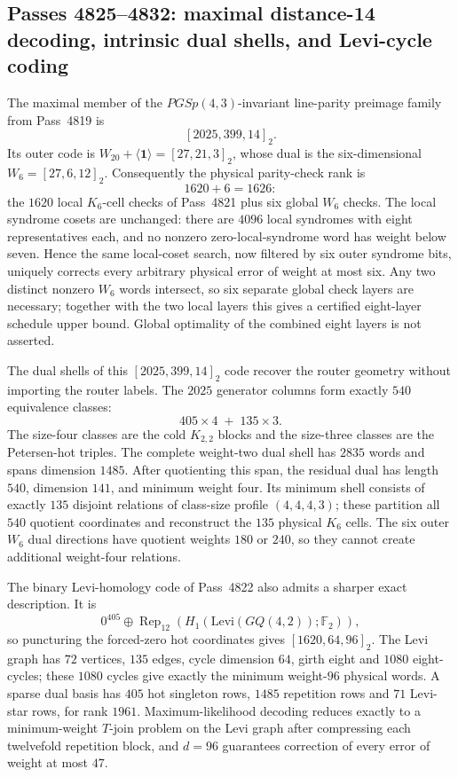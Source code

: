 \subsection{Passes 4825--4832: maximal distance-14 decoding, intrinsic dual shells, and Levi-cycle coding}
\label{subsec:pass4825-4832}

The maximal member of the $PGSp(4,3)$-invariant line-parity preimage family from Pass~4819 is
\[
[2025,399,14]_2.
\]
Its outer code is $W_{20}+\langle\mathbf1\rangle=[27,21,3]_2$, whose dual is the six-dimensional $W_6=[27,6,12]_2$.  Consequently the physical parity-check rank is
\[
1620+6=1626:
\]
the $1620$ local $K_6$-cell checks of Pass~4821 plus six global $W_6$ checks.  The local syndrome cosets are unchanged: there are $4096$ local syndromes with eight representatives each, and no nonzero zero-local-syndrome word has weight below seven.  Hence the same local-coset search, now filtered by six outer syndrome bits, uniquely corrects every arbitrary physical error of weight at most six.  Any two distinct nonzero $W_6$ words intersect, so six separate global check layers are necessary; together with the two local layers this gives a certified eight-layer schedule upper bound.  Global optimality of the combined eight layers is not asserted.

The dual shells of this $[2025,399,14]_2$ code recover the router geometry without importing the router labels.  The $2025$ generator columns form exactly $540$ equivalence classes:
\[
405\times4\; +\;135\times3.
\]
The size-four classes are the cold $K_{2,2}$ blocks and the size-three classes are the Petersen-hot triples.  The complete weight-two dual shell has $2835$ words and spans dimension $1485$.  After quotienting this span, the residual dual has length $540$, dimension $141$, and minimum weight four.  Its minimum shell consists of exactly $135$ disjoint relations of class-size profile $(4,4,4,3)$; these partition all $540$ quotient coordinates and reconstruct the $135$ physical $K_6$ cells.  The six outer $W_6$ dual directions have quotient weights $180$ or $240$, so they cannot create additional weight-four relations.

The binary Levi-homology code of Pass~4822 also admits a sharper exact description.  It is
\[
0^{405}\oplus \operatorname{Rep}_{12}\!\left(H_1(\mathrm{Levi}(GQ(4,2));\mathbb F_2)\right),
\]
so puncturing the forced-zero hot coordinates gives $[1620,64,96]_2$.  The Levi graph has $72$ vertices, $135$ edges, cycle dimension $64$, girth eight and $1080$ eight-cycles; these $1080$ cycles give exactly the minimum weight-$96$ physical words.  A sparse dual basis has $405$ hot singleton rows, $1485$ repetition rows and $71$ Levi-star rows, for rank $1961$.  Maximum-likelihood decoding reduces exactly to a minimum-weight $T$-join problem on the Levi graph after compressing each twelvefold repetition block, and $d=96$ guarantees correction of every error of weight at most $47$.


